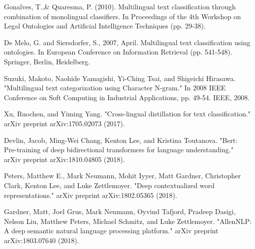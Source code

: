 \documentclass[letterpaper,12pt]{article}
\begin{document}
\begin{thebibliography}{}
	
Gonalves, T.,\& Quaresma, P. (2010). Multilingual text classification through combination of monolingual classifiers. In Proceedings of the 4th Workshop on Legal Ontologies and Artificial Intelligence Techniques (pp. 29-38).

De Melo, G. and Siersdorfer, S., 2007, April. Multilingual text classification using ontologies. In European Conference on Information Retrieval (pp. 541-548). Springer, Berlin, Heidelberg.

Suzuki, Makoto, Naohide Yamagishi, Yi-Ching Tsai, and Shigeichi Hirasawa. "Multilingual text categorization using Character N-gram." In 2008 IEEE Conference on Soft Computing in Industrial Applications, pp. 49-54. IEEE, 2008.

Xu, Ruochen, and Yiming Yang. "Cross-lingual distillation for text classification." arXiv preprint arXiv:1705.02073 (2017).


Devlin, Jacob, Ming-Wei Chang, Kenton Lee, and Kristina Toutanova. "Bert: Pre-training of deep bidirectional transformers for language understanding." arXiv preprint arXiv:1810.04805 (2018).

Peters, Matthew E., Mark Neumann, Mohit Iyyer, Matt Gardner, Christopher Clark, Kenton Lee, and Luke Zettlemoyer. "Deep contextualized word representations." arXiv preprint arXiv:1802.05365 (2018).

Gardner, Matt, Joel Grus, Mark Neumann, Oyvind Tafjord, Pradeep Dasigi, Nelson Liu, Matthew Peters, Michael Schmitz, and Luke Zettlemoyer. "AllenNLP: A deep semantic natural language processing platform." arXiv preprint arXiv:1803.07640 (2018).



\end{thebibliography}
\end{document}

